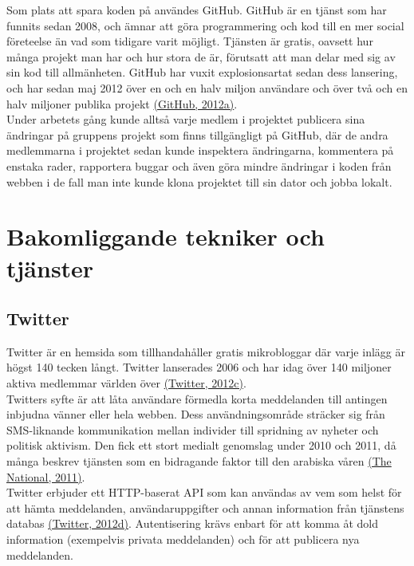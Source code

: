 \documentclass[a4paper,11pt]{article}
\begin{document}
Som plats att spara koden på användes GitHub. GitHub är en tjänst som har funnits sedan 2008, och ämnar att göra programmering och kod till en mer social företeelse än vad som tidigare varit möjligt. Tjänsten är gratis, oavsett hur många projekt man har och hur stora de är, förutsatt att man delar med sig av sin kod till allmänheten. GitHub har vuxit explosionsartat sedan dess lansering, och har sedan maj 2012 över en och en halv miljon användare och över två och en halv miljoner publika projekt \hyperref[github]{(GitHub, 2012a)}.\\

Under arbetets gång kunde alltså varje medlem i projektet publicera sina ändringar på gruppens projekt som finns tillgängligt på GitHub, där de andra medlemmarna i projektet sedan kunde inspektera ändringarna, kommentera på enstaka rader, rapportera buggar och även göra mindre ändringar i koden från webben i de fall man inte kunde klona projektet till sin dator och jobba lokalt.

\section{Bakomliggande tekniker och tjänster}

\subsection{Twitter}

Twitter är en hemsida som tillhandahåller gratis mikrobloggar där varje inlägg är högst 140 tecken långt. Twitter lanserades 2006 och har idag över 140 miljoner aktiva medlemmar världen över \hyperref[twitter]{(Twitter, 2012c)}. \\

Twitters syfte är att låta användare förmedla korta meddelanden till antingen inbjudna vänner eller hela webben. Dess användningsområde sträcker sig från SMS-liknande kommunikation mellan individer till spridning av nyheter och politisk aktivism. Den fick ett stort medialt genomslag under 2010 och 2011, då många beskrev tjänsten som en bidragande faktor till den arabiska våren \hyperref[national]{(The National, 2011)}. \\

Twitter erbjuder ett HTTP-baserat API som kan användas av vem som helst för att hämta meddelanden, användaruppgifter och annan information från tjänstens databas \hyperref[twitter]{(Twitter, 2012d)}. Autentisering krävs enbart för att komma åt dold information (exempelvis privata meddelanden) och för att publicera nya meddelanden. \\
\end{document}
